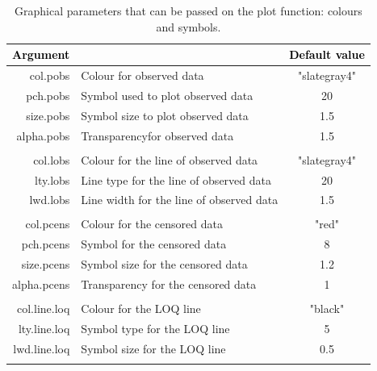 \documentclass{report}
\begin{document}
\begin{table}[!h] 
\begin{center}
\begin{tabular}{| r p{8cm} c|}
\hline
\textbf{\textcolor{black}{Argument}} & \centering{\textbf{\textcolor{black}{Description }}} & \textbf{\textcolor{black}{Default value}} \\
\hline
{\ttfamily col.pobs} & Colour for observed data & "slategray4"  \\
{\ttfamily pch.pobs} & Symbol used to plot observed data &  20 \\
{\ttfamily size.pobs} & Symbol size to plot observed data & 1.5  \\
{\ttfamily alpha.pobs} & Transparencyfor observed data  & 1.5 \\
{\ttfamily } & &  \\

{\ttfamily col.lobs} & Colour for the line of observed data & "slategray4"  \\
{\ttfamily lty.lobs} & Line type for the line of observed data &  20 \\
{\ttfamily lwd.lobs} & Line width  for the line of observed data & 1.5  \\
{\ttfamily } & &  \\

{\ttfamily col.pcens} & Colour for the censored data  & "red"  \\
{\ttfamily pch.pcens} & Symbol for the censored data  &  8 \\
{\ttfamily size.pcens} & Symbol size for the censored data  &  1.2 \\
{\ttfamily alpha.pcens} &Transparency for the censored data & 1  \\
{\ttfamily } & &  \\

{\ttfamily col.line.loq} & Colour for the LOQ line  & "black"  \\
{\ttfamily lty.line.loq} & Symbol type for the LOQ line &  5 \\
{\ttfamily lwd.line.loq} & Symbol size for the LOQ line &  0.5 \\
{\ttfamily } & &  \\

\hline
\end{tabular} 
\end{center}
\caption{Graphical parameters that can be passed on the plot function: colours and symbols.} \label{tab:graphicalOptions3}
\end{table} 
\end{document}
